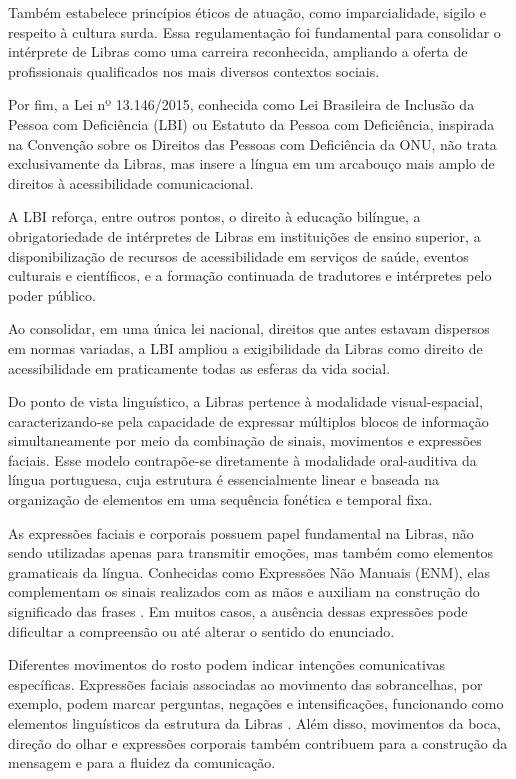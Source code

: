 \documentclass[
    12pt,                %
    openright,           %
    oneside,             %
    a4paper,             %
    english,             %
    brazil               %
]{abntex2}
\begin{document}
Também estabelece princípios éticos de atuação, como imparcialidade, sigilo e respeito à cultura surda. Essa regulamentação foi fundamental para consolidar o intérprete de Libras como uma carreira reconhecida, ampliando a oferta de profissionais qualificados nos mais diversos contextos sociais.
 
Por fim, a Lei nº 13.146/2015, conhecida como Lei Brasileira de Inclusão da Pessoa com Deficiência (LBI) ou Estatuto da Pessoa com Deficiência, inspirada na Convenção sobre os Direitos das Pessoas com Deficiência da ONU, não trata exclusivamente da Libras, mas insere a língua em um arcabouço mais amplo de direitos à acessibilidade comunicacional. 

A LBI reforça, entre outros pontos, o direito à educação bilíngue, a obrigatoriedade de intérpretes de Libras em instituições de ensino superior, a disponibilização de recursos de acessibilidade em serviços de saúde, eventos culturais e científicos, e a formação continuada de tradutores e intérpretes pelo poder público. 

Ao consolidar, em uma única lei nacional, direitos que antes estavam dispersos em normas variadas, a LBI ampliou a exigibilidade da Libras como direito de acessibilidade em praticamente todas as esferas da vida social.

Do ponto de vista linguístico, a Libras pertence à modalidade visual-espacial, caracterizando-se pela capacidade de expressar múltiplos blocos de informação simultaneamente por meio da combinação de sinais, movimentos e expressões faciais. Esse modelo contrapõe-se diretamente à modalidade oral-auditiva da língua portuguesa, cuja estrutura é essencialmente linear e baseada na organização de elementos em uma sequência fonética e temporal fixa.

As expressões faciais e corporais possuem papel fundamental na Libras, não sendo utilizadas apenas para transmitir emoções, mas também como elementos gramaticais da língua. Conhecidas como Expressões Não Manuais (ENM), elas complementam os sinais realizados com as mãos e auxiliam na construção do significado das frases \cite{Quadros2004}. Em muitos casos, a ausência dessas expressões pode dificultar a compreensão ou até alterar o sentido do enunciado.

Diferentes movimentos do rosto podem indicar intenções comunicativas específicas. Expressões faciais associadas ao movimento das sobrancelhas, por exemplo, podem marcar perguntas, negações e intensificações, funcionando como elementos linguísticos da estrutura da Libras \cite{Brito1995}. Além disso, movimentos da boca, direção do olhar e expressões corporais também contribuem para a construção da mensagem e para a fluidez da comunicação.
\end{document}

